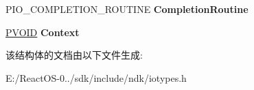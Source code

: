 \begin{DoxyCompactItemize}
\begin{tabbing}
\end{tabbing}\item 
\mbox{\label{struct___e_x_t_e_n_d_e_d___i_o___s_t_a_c_k___l_o_c_a_t_i_o_n_aead01afa15e85d4fd559c45970d2ff08}} 
P\+I\+O\+\_\+\+C\+O\+M\+P\+L\+E\+T\+I\+O\+N\+\_\+\+R\+O\+U\+T\+I\+NE {\bfseries Completion\+Routine}
\item 
\mbox{\label{struct___e_x_t_e_n_d_e_d___i_o___s_t_a_c_k___l_o_c_a_t_i_o_n_a939276bd1bfdb417a2553cafa3793d65}} 
\hyperlink{interfacevoid}{P\+V\+O\+ID} {\bfseries Context}
\end{DoxyCompactItemize}


该结构体的文档由以下文件生成\+:\begin{DoxyCompactItemize}
\item 
E\+:/\+React\+O\+S-\/0../sdk/include/ndk/iotypes.\+h\end{DoxyCompactItemize}

